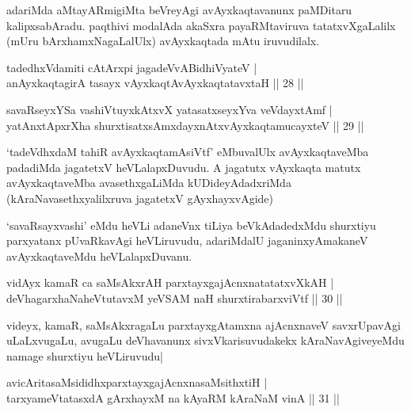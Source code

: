 \begin{artha}
adariMda aMtayARmigiMta beVreyAgi avAyxkaqtavanunx paMDitaru kalipxsa\-bAradu. paqthivi modalAda akaSxra payaRMtaviruva tatatxvXgaLalilx (mUru bArxhamxNagaLalUlx) avAyxkaqtada mAtu iruvudilalx.
\end{artha}

\begin{shl}
tadedhxVdamiti cAtArxpi jagadeVvABidhiVyateV |\\
anAyxkaqtagirA tasayx vAyxkaqtAvAyxkaqtatavxtaH \hfill || 28 ||
\end{shl}

\begin{shl}
savaRseyxYSa vashiVtuyxkAtxvX yatasatxseyxYva veVdayxtAmf |\\
yatAnxtApxrXha shurxtisatxsAmxdayxnAtx\s vAyxkaqtamucayxteV \hfill || 29 ||
\end{shl}

\begin{artha}
`tadeVdhxdaM tahiR avAyxkaqtamAsiVtf' eMbuvalUlx avAyxkaqtaveMba padadiMda jagatetxV heVLalapxDuvudu. A jagatutx vAyxkaqta matutx avAyxkaqtaveMba avasethxgaLiMda kUDideyAdadxriMda (kAraNavasethxyalilxruva jagatetxV gAyxhayxvAgide)

`savaRsayxvashi' eMdu heVLi adaneVnx tiLiya beVkAdadedxMdu shurxtiyu parxyatanx pUvaRkavAgi heVLiruvudu, adariMdalU jaganinxyAmakaneV avAyxkaqtaveMdu heVLalapxDuvanu.
\end{artha}


\begin{shl}
vidAyx kamaR ca saMsAkxrAH parxtayxgajAcnxnatatatxvXkAH |\\
deVhagarxhaNaheVtutavxM yeVSAM naH shurxtirabarxviVtf \hfill || 30 ||
\end{shl}

\begin{artha}
videyx, kamaR, saMsAkxragaLu parxtayxgAtamxna ajAcnxnaveV savxrUpavAgi uLaLxvugaLu, avugaLu deVhavanunx sivxVkarisuvudakekx kAraNavAgiveyeMdu namage shurxtiyu heVLiruvudu|
\end{artha}

\begin{shl}
avicAritasaMsididhxparxtayxgajAcnxnasaMsithxtiH |\\
tarxyameVtatasxdA gArxhayxM na kAyaRM kAraNaM vinA \hfill || 31 ||
\end{shl}

